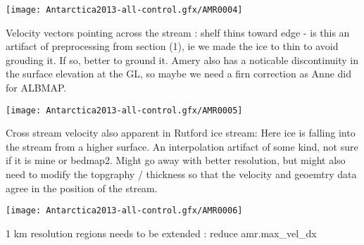 \documentclass{article}
\begin{document}
\begin{center}
\texttt{[image: Antarctica2013-all-control.gfx/AMR0004]}
\end{center}

Velocity vectors pointing across the stream : shelf thins toward edge - is this an artifact
of preprocessing from section (1), ie we made the ice to thin to avoid grouding it. If
so, better to ground it. Amery also has a noticable discontinuity in the surface elevation at the
GL, so maybe we need a firn correction as Anne did for ALBMAP.

\begin{center}
\texttt{[image: Antarctica2013-all-control.gfx/AMR0005]}
\end{center}

Cross stream velocity also apparent in Rutford ice stream: Here ice is falling into
the stream from a higher surface.  An interpolation artifact of some kind, not sure if it is mine
or bedmap2. Might go away with better resolution, but might also need to modify the topgraphy / thickness 
so that the velocity and geoemtry data agree in the position of the stream. 


\begin{center}
\texttt{[image: Antarctica2013-all-control.gfx/AMR0006]}
\end{center}

1 km resolution regions needs to be extended : reduce amr.max\_vel\_dx 




\end{document}
